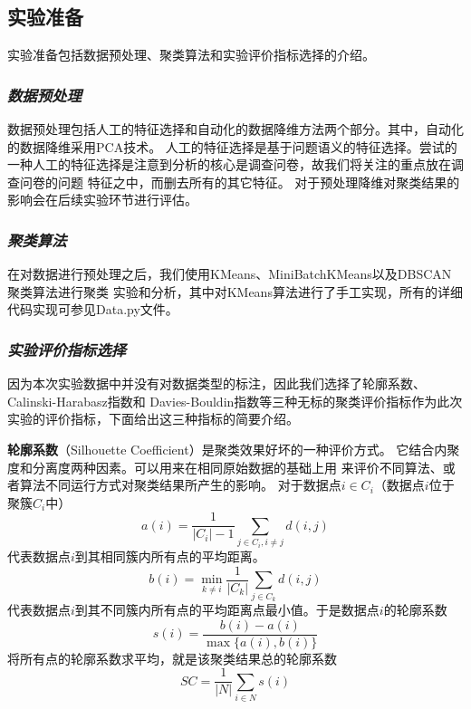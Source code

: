 \documentclass{acm_proc_article-sp}
\begin{document}
\subsection{\textsf{实验准备}}
实验准备包括数据预处理、聚类算法和实验评价指标选择的介绍。
\subsubsection{\textit{数据预处理}}

数据预处理包括人工的特征选择和自动化的数据降维方法两个部分。其中，自动化的数据降维采用PCA技术。
人工的特征选择是基于问题语义的特征选择。尝试的一种人工的特征选择是注意到分析的核心是调查问卷，故我们将关注的重点放在调查问卷的问题
特征之中，而删去所有的其它特征。
对于预处理降维对聚类结果的影响会在后续实验环节进行评估。


\subsubsection{\textit{聚类算法}}

在对数据进行预处理之后，我们使用KMeans、MiniBatchKMeans以及DBSCAN聚类算法进行聚类
实验和分析，其中对KMeans算法进行了手工实现，所有的详细代码实现可参见Data.py文件。

\subsubsection{\textit{实验评价指标选择}}

因为本次实验数据中并没有对数据类型的标注，因此我们选择了轮廓系数、Calinski-Harabasz指数和
Davies-Bouldin指数等三种无标的聚类评价指标作为此次实验的评价指标，下面给出这三种指标的简要介绍。

\textbf{轮廓系数}（Silhouette Coefficient）是聚类效果好坏的一种评价方式。
它结合内聚度和分离度两种因素。可以用来在相同原始数据的基础上用
来评价不同算法、或者算法不同运行方式对聚类结果所产生的影响。
对于数据点$i \in C_i$（数据点$i$位于聚簇$C_i$中）
$$a(i) = \frac{1}{|C_i| - 1} \sum_{j \in C_i, i \neq j} d(i, j)$$
代表数据点$i$到其相同簇内所有点的平均距离。
$$b(i) = \min_{k \neq i} \frac{1}{|C_k|} \sum_{j \in C_k} d(i, j)$$
代表数据点$i$到其不同簇内所有点的平均距离点最小值。于是数据点$i$的轮廓系数
$$s(i) = \frac{b(i) - a(i)}{\max\{a(i),b(i)\}}$$
将所有点的轮廓系数求平均，就是该聚类结果总的轮廓系数
$$\mathit{SC}=\frac{1}{|N|} \sum_{i\in N} s(i)$$
\end{document}
